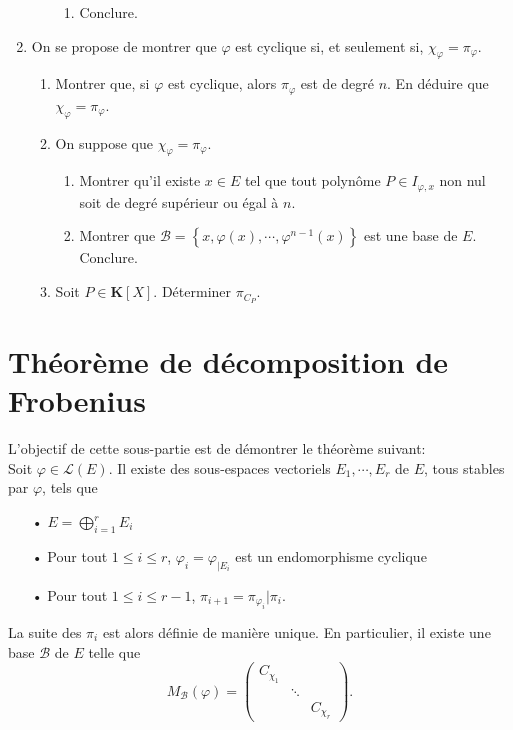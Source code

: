 \documentclass[a4paper,11pt]{article}
\newcommand{\K}{\mathbf{K}}
\newcommand{\B}{\mathcal{B}}
\renewcommand{\L}{\mathcal{L}}
\begin{document}
\begin{enumerate}
\begin{enumerate}
\begin{enumerate}
\item Conclure.
\end{enumerate}
\end{enumerate}
\item On se propose de montrer que $\varphi$ est cyclique si, et seulement si, $\chi_\varphi=\pi_\varphi$.
\begin{enumerate}
\item Montrer que, si $\varphi$ est cyclique, alors $\pi_\varphi$ est de degré $n$. En déduire que $\chi_\varphi=\pi_\varphi$.
\item On suppose que $\chi_\varphi=\pi_\varphi$.
\begin{enumerate}
\item Montrer qu'il existe $x\in E$ tel que tout polynôme $P\in I_{\varphi,x}$ non nul soit de degré supérieur ou égal à $n$.
\item Montrer que $\B=\left\lbrace x,\varphi(x),\cdots,\varphi^{n-1}(x)\right\rbrace$ est une base de $E$. Conclure.
\end{enumerate}
\item Soit $P\in\K[X]$. Déterminer $\pi_{C_P}$.
\end{enumerate}
\end{enumerate}

\section{Théorème de décomposition de Frobenius}
L'objectif de cette sous-partie est de démontrer le théorème suivant:\\

Soit $\varphi\in\L(E)$. Il existe des sous-espaces vectoriels $E_1,\cdots,E_r$ de $E$, tous stables par $\varphi$, tels que 
\begin{itemize}
\item[•] $E=\displaystyle\bigoplus_{i=1}^rE_i$
\item[•] Pour tout $1\leq i\leq r$, $\varphi_i=\varphi_{\vert E_i}$ est un endomorphisme cyclique
\item[•] Pour tout $1\leq i\leq r-1$, $\pi_{i+1}=\pi_{\varphi_i}\vert\pi_i$.
\end{itemize}
La suite des $\pi_i$ est alors définie de manière unique. En particulier, il existe une base $\B$ de $E$ telle que
\[M_\B(\varphi)=
\begin{pmatrix}
C_{\chi_1}\\
&\ddots\\
&&C_{\chi_r}
\end{pmatrix}.\]
\end{document}
